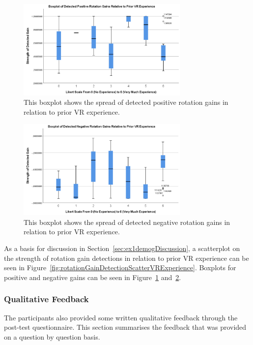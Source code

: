\begin{figure}[tbph]
    \centering
    \includegraphics[width=0.75\textwidth]{figures/graphs/PosRotDetectionsByVRExperience.png}
    \caption[Boxplot on Detected Positive Rotation Gains by VR Experience]{This boxplot shows the spread of detected positive rotation gains in relation to prior VR experience.}
    \label{fig:posRotDetectionBoxplotVRExperience}
\end{figure}

\begin{figure}[tbph]
    \centering
    \includegraphics[width=0.75\textwidth]{figures/graphs/NegRotDetectionsByVRExperience.png}
    \caption[Boxplot on Detected Negative Rotation Gains by VR Experience]{This boxplot shows the spread of detected negative rotation gains in relation to prior VR experience.}
    \label{fig:negRotDetectionBoxplotVRExperience}
\end{figure}

As a basis for discussion in Section~\ref{sec:ex1demogDiscussion}, a scatterplot on the strength of rotation gain detections in relation to prior VR experience can be seen in Figure~\ref{fig:rotationGainDetectionScatterVRExperience}. Boxplots for positive and negative gains can be seen in Figure~\ref{fig:posRotDetectionBoxplotVRExperience} and~\ref{fig:negRotDetectionBoxplotVRExperience}.


\subsubsection{Qualitative Feedback}
The participants also provided some written qualitative feedback through the post-test questionnaire. This section summarises the feedback that was provided on a question by question basis. 


